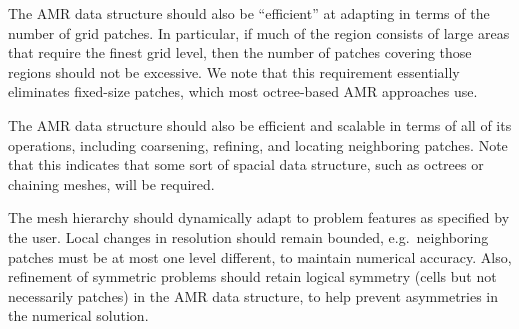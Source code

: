 \documentclass{article}
\begin{document}
The AMR data structure should also be ``efficient'' at adapting in
terms of the number of grid patches.  In particular, if much of the
region consists of large areas that require the finest grid level,
then the number of patches covering those regions should not be
excessive.  We note that this requirement essentially eliminates
fixed-size patches, which most octree-based AMR approaches use.

The AMR data structure should also be efficient and scalable in terms
of all of its operations, including coarsening, refining, and locating
neighboring patches.  Note that this indicates that some sort of
spacial data structure, such as octrees or chaining meshes, will
be required.

The mesh hierarchy should dynamically adapt to problem features as
specified by the user.  Local changes in resolution should remain
bounded, e.g.~neighboring patches must be at most one level different,
to maintain numerical accuracy.  Also, refinement of symmetric
problems should retain logical symmetry (cells but not necessarily
patches) in the AMR data structure, to help prevent asymmetries in the
numerical solution.

\end{document}
